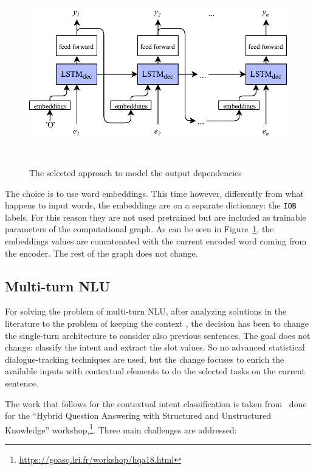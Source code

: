 \begin{figure}[!htb]
    \centering
    \includegraphics[max width=0.9\linewidth,max height=8cm,keepaspectratio]{figures/outputDependencies}
    \caption{The selected approach to model the output dependencies}\label{fig:outputDependencies}
\end{figure}

The choice is to use word embeddings. This time however, differently from what happens to input words, the embeddings are on a separate dictionary: the \texttt{IOB} labels. For this reason they are not used pretrained but are included as trainable parameters of the computational graph. As can be seen in Figure~\ref{fig:outputDependencies}, the embeddings values are concatenated with the current encoded word coming from the encoder. The rest of the graph does not change.

\subsection{Multi-turn NLU}
\label{approachMultiTurn}

For solving the problem of multi-turn NLU, after analyzing solutions in the literature to the problem of keeping the context \cite{xu2014contextual,bhargava2013easy,shi2015contextual,serban2016building}, the decision has been to change the single-turn architecture to consider also previous sentences. The goal does not change: classify the intent and extract the slot values. So no advanced statistical dialogue-tracking techniques are used, but the change focuses to enrich the available inputs with contextual elements to do the selected tasks on the current sentence.

The work that follows for the contextual intent classification is taken from~\cite{mensio2018multi} done for the ``Hybrid Question Answering with Structured and Unstructured Knowledge'' workshop,\footnote{\url{https://goasq.lri.fr/workshop/hqa18.html}}. Three main challenges are addressed:

